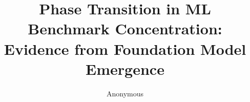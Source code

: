 \documentclass[letterpaper]{article}
\title{Phase Transition in ML Benchmark Concentration: Evidence from Foundation Model Emergence}
\author{Anonymous}
\date{}
\begin{document}
\maketitle

\begin{abstract}

\end{abstract}











\end{document}
